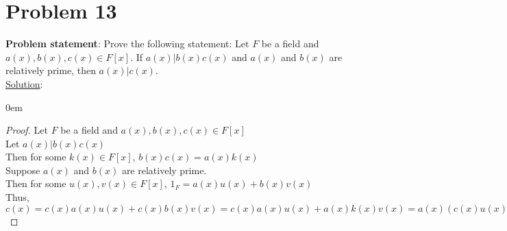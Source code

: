 \documentclass{article} %
\begin{document}
\section*{Problem 13}
\textbf{Problem statement}: Prove the following statement: Let $F$ be a field and $a(x),b(x),c(x) \in F[x]$.  If $a(x)|b(x)c(x)$ and $a(x)$ and $b(x)$ are relatively prime, then $a(x)|c(x)$.
\\

\underline{Solution}: 
\begin{addmargin}[1em]{0em}
\begin{proof}
Let $F$ be a field and $a(x), b(x), c(x) \in F[x]$
\\Let $a(x)|b(x)c(x)$
\\Then for some $k(x) \in F[x]$, $b(x)c(x) = a(x)k(x)$
\\Suppose $a(x)$ and $b(x)$ are relatively prime.
\\Then for some $u(x),v(x) \in F[x]$, $1_F = a(x)u(x) + b(x)v(x)$
\\Thus, $c(x) = c(x)a(x)u(x) + c(x)b(x)v(x) = c(x)a(x)u(x) + a(x)k(x)v(x) = a(x)(c(x)u(x) + k(x)v(x)) \implies a(x)|c(x)$
\end{proof}
\end{addmargin}
\end{document}
